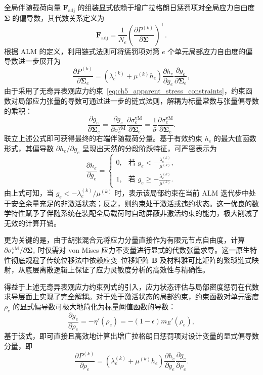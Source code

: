 全局伴随载荷向量 $\boldsymbol{F}_{\text{adj}}$ 的组装显式依赖于增广拉格朗日惩罚项对全局应力自由度 $\boldsymbol{\Sigma}$ 的偏导数，其代数关系定义为
\[
\boldsymbol{F}_{\text{adj}} = \frac{1}{N_e} \left( \frac{\partial P^{(k)}}{\partial \boldsymbol{\Sigma}} \right)^{\top}.
\]
根据 ALM 的定义，利用链式法则可将惩罚项对第 $e$ 个单元局部应力自由度的偏导数进一步展开为
\[
\frac{\partial P^{(k)}}{\partial \boldsymbol{\Sigma}_e} = \left( \lambda_e^{(k)} + \mu^{(k)} h_e \right) \frac{\partial h_e}{\partial g_e} \frac{\partial g_e}{\partial \boldsymbol{\Sigma}_e},
\]
由于采用了无奇异表观应力约束~\eqref{eq:ch5_apparent_stress_constraints}，约束函数对局部应力张量的导数可通过进一步的链式法则，解耦为标量常数与张量偏导数的乘积：
\[
\frac{\partial g_e}{\partial \boldsymbol{\Sigma}_e} = \frac{\partial g_e}{\partial \sigma_e^{\mathrm{vM}}} \frac{\partial \sigma_e^{\mathrm{vM}}}{\partial \boldsymbol{\Sigma}_e} = \frac{1}{\bar{\sigma}} \frac{\partial \sigma_e^{\mathrm{vM}}}{\partial \boldsymbol{\Sigma}_e}.
\]
联立上述公式即可获得最终的右端伴随载荷分量。基于有效约束 $h_e$ 的最大值函数形式，其偏导数 $\partial h_e / \partial g_e$ 呈现出天然的分段阶跃特征，可严密表示为
\[
\frac{\partial h_e}{\partial g_e} = 
\begin{cases} 
	0, & \text{若 } g_e < -\frac{\lambda_e^{(k)}}{\mu^{(k)}}, \\ 
	1, & \text{若 } g_e \ge -\frac{\lambda_e^{(k)}}{\mu^{(k)}}. 
\end{cases}
\]
由上式可知，当 $g_e < -\lambda_e^{(k)}/\mu^{(k)}$ 时，表示该局部约束在当前 ALM 迭代步中处于安全余量充足的非激活状态；反之，则约束处于激活或违约状态。这一优良的数学特性赋予了伴随系统在装配全局载荷时自动屏蔽非激活约束的能力，极大削减了无效的计算开销。

更为关键的是，由于胡张混合元将应力分量直接作为有限元节点自由度，计算 $\partial \sigma_e^{\mathrm{vM}} / \partial \boldsymbol{\Sigma}_e$ 时仅需对 von Mises 应力不变量进行显式的代数张量求导。这一原生特性彻底规避了传统位移法中依赖应变--位移矩阵 $\boldsymbol{B}$ 及材料雅可比矩阵的繁琐链式映射，从底层离散逻辑上保证了应力灵敏度分析的高效性与精确性。

得益于上述无奇异表观应力约束列式的引入，应力状态评估与局部密度惩罚在代数求导层面上实现了完全解耦。对于处于激活状态的局部约束，约束函数对单元密度 $\rho_e$ 的显式偏导数可极大地简化为标量阈值函数的导数：
\[
\frac{\partial g_e}{\partial \rho_e} = - \eta'(\rho_e) = - (1 - \epsilon) m_E'(\rho_e),
\]
基于该式，即可直接且高效地计算出增广拉格朗日惩罚项对设计变量的显式偏导数分量，即
\[
\frac{\partial P^{(k)}}{\partial \rho_e} = \left( \lambda_e^{(k)} + \mu^{(k)} h_e \right) \frac{\partial h_e}{\partial g_e} \frac{\partial g_e}{\partial \rho_e}.
\]

